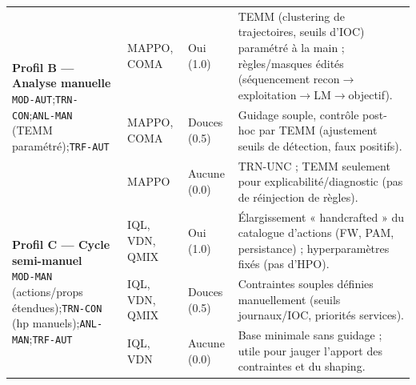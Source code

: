 \begin{table}[h!]
\begin{tabularx}{\textwidth}{p{3.8cm}p{2.6cm}p{2.8cm}p{4.6cm}}
    \multirow{3}{*}{\parbox{3.8cm}{\textbf{Profil B — Analyse manuelle}                                                                                                                                                                                                                 \\
        \texttt{MOD-AUT};\;\texttt{TRN-CON};\;\texttt{ANL-MAN} (TEMM paramétré);\;\texttt{TRF-AUT}}}
                                      & MAPPO, COMA               & Oui (1.0)                          & TEMM (clustering de trajectoires, seuils d’IOC) paramétré à la main ; règles/masques édités (séquencement recon$\rightarrow$exploitation$\rightarrow$LM$\rightarrow$objectif). \\
                                      & MAPPO, COMA               & Douces (0.5)                       & Guidage souple, contrôle post-hoc par TEMM (ajustement seuils de détection, faux positifs).                                                                                    \\
                                      & MAPPO                     & Aucune (0.0)                       & TRN-UNC ; TEMM seulement pour explicabilité/diagnostic (pas de réinjection de règles).                                                                                         \\
    \midrule
    \multirow{3}{*}{\parbox{3.8cm}{\textbf{Profil C — Cycle semi-manuel}                                                                                                                                                                                                                \\
        \texttt{MOD-MAN} (actions/props étendues);\;\texttt{TRN-CON} (hp manuels);\;\texttt{ANL-MAN};\;\texttt{TRF-AUT}}}
                                      & IQL, VDN, QMIX            & Oui (1.0)                          & Élargissement « handcrafted » du catalogue d’actions (FW, PAM, persistance) ; hyperparamètres fixés (pas d’HPO).                                                               \\
                                      & IQL, VDN, QMIX            & Douces (0.5)                       & Contraintes souples définies manuellement (seuils journaux/IOC, priorités services).                                                                                           \\
                                      & IQL, VDN                  & Aucune (0.0)                       & Base minimale sans guidage ; utile pour jauger l’apport des contraintes et du shaping.                                                                                         \\
    \bottomrule
  \end{tabularx}
\end{table}


